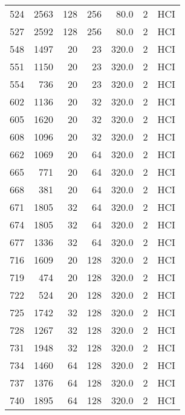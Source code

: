 \begin{longtable}{lrrrrrl}
524 &      2563 &        128 &       256 &           80.0 &       2 &  HCI \\
527 &      2592 &        128 &       256 &           80.0 &       2 &  HCI \\
548 &      1497 &         20 &        23 &          320.0 &       2 &  HCI \\
551 &      1150 &         20 &        23 &          320.0 &       2 &  HCI \\
554 &       736 &         20 &        23 &          320.0 &       2 &  HCI \\
602 &      1136 &         20 &        32 &          320.0 &       2 &  HCI \\
605 &      1620 &         20 &        32 &          320.0 &       2 &  HCI \\
608 &      1096 &         20 &        32 &          320.0 &       2 &  HCI \\
662 &      1069 &         20 &        64 &          320.0 &       2 &  HCI \\
665 &       771 &         20 &        64 &          320.0 &       2 &  HCI \\
668 &       381 &         20 &        64 &          320.0 &       2 &  HCI \\
671 &      1805 &         32 &        64 &          320.0 &       2 &  HCI \\
674 &      1805 &         32 &        64 &          320.0 &       2 &  HCI \\
677 &      1336 &         32 &        64 &          320.0 &       2 &  HCI \\
716 &      1609 &         20 &       128 &          320.0 &       2 &  HCI \\
719 &       474 &         20 &       128 &          320.0 &       2 &  HCI \\
722 &       524 &         20 &       128 &          320.0 &       2 &  HCI \\
725 &      1742 &         32 &       128 &          320.0 &       2 &  HCI \\
728 &      1267 &         32 &       128 &          320.0 &       2 &  HCI \\
731 &      1948 &         32 &       128 &          320.0 &       2 &  HCI \\
734 &      1460 &         64 &       128 &          320.0 &       2 &  HCI \\
737 &      1376 &         64 &       128 &          320.0 &       2 &  HCI \\
740 &      1895 &         64 &       128 &          320.0 &       2 &  HCI \\

\end{longtable}
